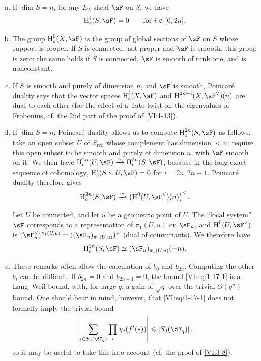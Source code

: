 \begin{enumerate}[a)]
  \item If $\dim S=n$, for any $E_\lambda$-sheaf $\sF$ on $S$, we have 
    \[
      \h_c^i(S,\sF) = 0 \qquad \text{for $i\notin [0,2n]$.}
    \]
  \item The group $\h_c^0(X,\sF)$ is the group of global sections of $\sF$ 
    on $S$ whose support is proper. If $S$ is connected, not proper and 
    $\sF$ is smooth, this group is zero; the same holds if $S$ is connected, 
    $\sF$ is smooth of rank one, and is nonconstant.
  \item If $S$ is smooth and purely of dimension $n$, and $\sF$ is smooth, 
    Poincaré duality says that the vector spaces 
    $\h_c^i(X,\sF)$ and $\h^{2n-i}(X,\sF^\vee)(n)$ are dual to each other 
    (for the effect of a Tate twist on the eigenvalues of Frobenius, 
    cf. the $2$nd part of the proof of \ref{VI:1-13}).
  \item If $\dim S=n$, Poincaré duality allows us to compute 
    $\h_c^{2n}(S,\sF)$ as follows: take an open subset $U$ of $S_\text{red}$ 
    whose complement has dimension $<n$; require this open subset to be smooth and 
    purely of dimension $n$, with $\sF$ smooth on it. We then have 
    $\h_c^{2n}(U,\sF) \iso \h_c^{2n}(S,\sF)$, because in the long exact sequence 
    of cohomology, $\h_c^i(S\setminus U,\sF) = 0$ for $i=2n,2n-1$. 
    Poincaré duality therefore gives 
    \[
      \h_c^{2n}(S,\sF) \iso \left(\h^0(U,\sF^\vee)(n)\right)^\vee \text{.}
    \]
    
    Let $U$ be connected, and let $u$ be a geometric point of $U$. The 
    ``local system'' $\sF$ corresponds to a representation of 
    $\pi_1(U,u)$ on $\sF_u$, and $\h^0(U,\sF^\vee)$ is 
    $(\sF_u^\vee)^{\pi_1(U,u)}=((\sF_u)_{\pi_1(U,u)})^\vee$ (dual of 
    coinvariants). We therefore have 
    \[
      \h_c^{2n}(S,\sF) \simeq (\sF_u)_{\pi_1(U,u)}(-n) \text{.}
    \]
  \item These remarks often allow the calculation of $b_0$ and $b_{2n}$. 
    Computing the other $b_i$ can be difficult. If $b_{2n}=0$ and 
    $b_{2n-1}=0$, the bound \eqref{VI:eq:1-17-1} is a Lang--Weil bound, 
    with, for large $q$, a gain of $\sqrt q$ over the 
    trivial $O(q^n)$ bound. One should bear in mind, however, that 
    \eqref{VI:eq:1-17-1} does not formally imply the trivial bound 
    \[
      \left|\sum_{s\in S_0(\dF_q)} \prod_i \chi_i(f^i(s))\right| \leqslant \left| S_0(\dF_q)\right| \text{,}
    \]
    so it may be useful to take this into account (cf. the proof of \ref{VI:3-8}). 
\end{enumerate}

